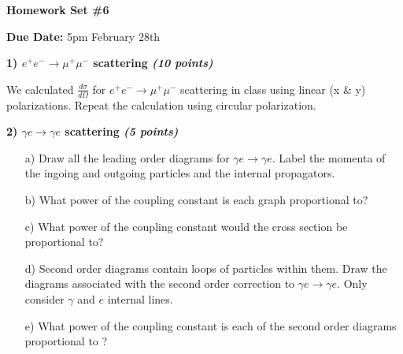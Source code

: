 


\thispagestyle{fancy}






\begin{center}
{\huge \textbf{Homework Set \#6}}
\large

{\textbf{ Due Date:} 5pm February 28th  } 
\end{center}

{\large

\textbf{1) $e^+ e^- \rightarrow \mu^+ \mu^-$ scattering   \hfill \textit{(10 points)} }

We calculated $\frac{d\sigma}{d\Omega}$ for $e^+ e^- \rightarrow \mu^+ \mu^-$ scattering in class using linear (x \& y) polarizations.
Repeat the calculation using circular polarization. 


\vspace*{0.25in}

\textbf{2)  $\gamma e \rightarrow \gamma e$ scattering \hfill \textit{(5 points)}}

\begin{itemize}

\item[a)]{ Draw all the leading order diagrams for $\gamma e \rightarrow \gamma e$.  
Label the momenta of the ingoing and outgoing particles and the internal propagators.
}
\item[b)]{What power of the coupling constant is each graph proportional to?
}
\item[c)]{
What power of the coupling constant would the cross section be proportional to?
}
\item[d)]{
Second order diagrams contain loops of particles within them.  Draw the diagrams associated with the second order correction to $\gamma e \rightarrow \gamma e$.
Only consider $\gamma$ and $e$ internal lines. 
}
\item[e)]{
What power of the coupling constant is each of the second order diagrams proportional to ?
}
\end{itemize}


}






